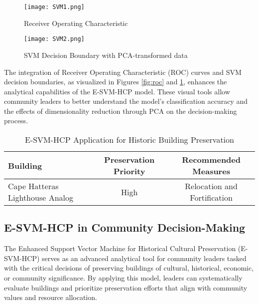 \documentclass{mcmthesis}
\begin{document}
\begin{figure}[h]
    \centering
    \begin{minipage}{.5\textwidth}
        \centering
        \texttt{[image: SVM1.png]} %
        \caption{Receiver Operating Characteristic}
        \label{fig:roc}
    \end{minipage}%
    \begin{minipage}{.5\textwidth}
        \centering
        \texttt{[image: SVM2.png]} %
        \caption{SVM Decision Boundary with PCA-transformed data}
        \label{fig:svm_boundary}
    \end{minipage}
\end{figure}

The integration of Receiver Operating Characteristic (ROC) curves and SVM decision boundaries, as visualized in Figures \ref{fig:roc} and \ref{fig:svm_boundary}, enhances the analytical capabilities of the E-SVM-HCP model. These visual tools allow community leaders to better understand the model's classification accuracy and the effects of dimensionality reduction through PCA on the decision-making process.

\begin{table}[h]
\centering
\caption{E-SVM-HCP Application for Historic Building Preservation}
\begin{tabular}{lcc}
\toprule
\textbf{Building} & \textbf{Preservation Priority} & \textbf{Recommended Measures} \\
\midrule
Cape Hatteras Lighthouse Analog & High & Relocation and Fortification \\
\bottomrule
\end{tabular}
\label{table:preservation}
\end{table}

\subsection{E-SVM-HCP in Community Decision-Making}

The Enhanced Support Vector Machine for Historical Cultural Preservation (E-SVM-HCP) serves as an advanced analytical tool for community leaders tasked with the critical decisions of preserving buildings of cultural, historical, economic, or community significance. By applying this model, leaders can systematically evaluate buildings and prioritize preservation efforts that align with community values and resource allocation.
\end{document}
